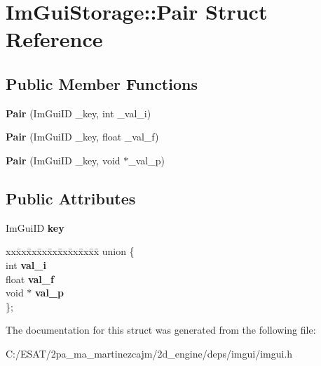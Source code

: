 \hypertarget{struct_im_gui_storage_1_1_pair}{}\section{Im\+Gui\+Storage\+:\+:Pair Struct Reference}
\label{struct_im_gui_storage_1_1_pair}
\subsection*{Public Member Functions}
\begin{DoxyCompactItemize}
\item 
\mbox{\label{struct_im_gui_storage_1_1_pair_a37542a22048f0af35e5a6beda6900a0e}} 
{\bfseries Pair} (Im\+Gui\+ID \+\_\+key, int \+\_\+val\+\_\+i)
\item 
\mbox{\label{struct_im_gui_storage_1_1_pair_a6f63f598513f2a7a57f2e9ea3b0137b9}} 
{\bfseries Pair} (Im\+Gui\+ID \+\_\+key, float \+\_\+val\+\_\+f)
\item 
\mbox{\label{struct_im_gui_storage_1_1_pair_a4d07d60f83b4e24ee8be9ccceaab76bd}} 
{\bfseries Pair} (Im\+Gui\+ID \+\_\+key, void $\ast$\+\_\+val\+\_\+p)
\end{DoxyCompactItemize}
\subsection*{Public Attributes}
\begin{DoxyCompactItemize}
\item 
\mbox{\label{struct_im_gui_storage_1_1_pair_a5b37b692d2eacc7f4f5b6f233359e6ce}} 
Im\+Gui\+ID {\bfseries key}
\item 
\mbox{\label{struct_im_gui_storage_1_1_pair_ad2451806614cefc6b2ac87343ae6a7cd}} 
\begin{tabbing}
xx\=xx\=xx\=xx\=xx\=xx\=xx\=xx\=xx\=\kill
union \{\\
\>int {\bfseries val\_i}\\
\>float {\bfseries val\_f}\\
\>void $\ast$ {\bfseries val\_p}\\
\}; \\

\end{tabbing}\end{DoxyCompactItemize}


The documentation for this struct was generated from the following file\+:\begin{DoxyCompactItemize}
\item 
C\+:/\+E\+S\+A\+T/2pa\+\_\+ma\+\_\+martinezcajm/2d\+\_\+engine/deps/imgui/imgui.\+h\end{DoxyCompactItemize}
